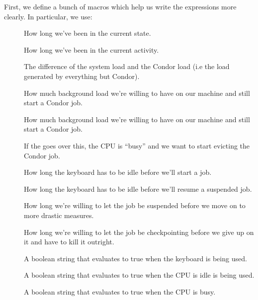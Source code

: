 First, we define a bunch of macros which help us write the expressions
more clearly.  In particular, we use:

\begin{description}
  
\item[] How long we've been in the current state.

\item[] How long we've been in the current
  activity. 

\item[] The difference of the system load and
  the Condor load (i.e the load generated by everything but Condor).

\item[] How much background load we're willing
  to have on our machine and still start a Condor job.

\item[] How much background load we're willing
  to have on our machine and still start a Condor job.

\item[] If the  goes over
  this, the CPU is ``busy'' and we want to start evicting the Condor
  job. 

\item[] How long the keyboard has to be idle
  before we'll start a job.

\item[] How long the keyboard has to be idle
  before we'll resume a suspended job.

\item[] How long we're willing to let the job be
  suspended before we move on to more drastic measures.

\item[] How long we're willing to let the job be
  checkpointing before we give up on it and have to kill it outright.

\item[] A boolean string that evaluates to true
    when the keyboard is being used. 

\item[] A boolean string that evaluates to true
    when the CPU is idle is being used.

\item[] A boolean string that evaluates to true
    when the CPU is busy.

\end{description}

